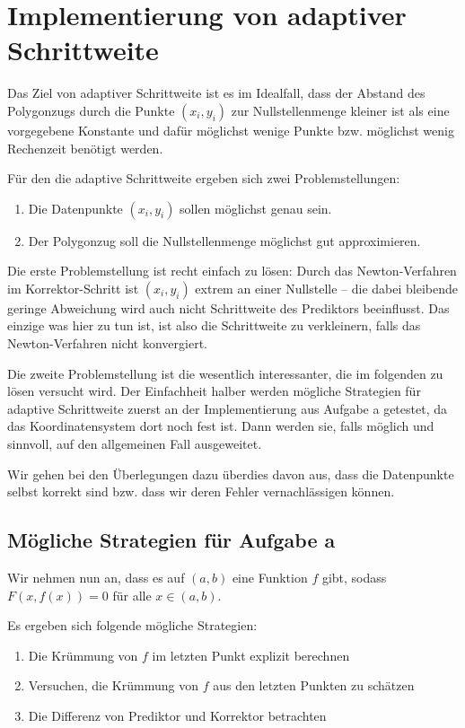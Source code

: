 \documentclass[a4paper,11pt,bibliography=totoc,listof=totoc,headinclude=true,cleardoublepage=empty,oneside]{scrartcl}
\begin{document}
\section{Implementierung von adaptiver Schrittweite}\label{chap:Schrittweite}
Das Ziel von adaptiver Schrittweite ist es im Idealfall, dass der Abstand des Polygonzugs durch die Punkte $(x_i,y_i)$ zur Nullstellenmenge kleiner ist als eine vorgegebene Konstante und dafür möglichst wenige Punkte bzw. möglichst wenig Rechenzeit benötigt werden.

Für den die adaptive Schrittweite ergeben sich zwei Problemstellungen:
\begin{enumerate}
	\item Die Datenpunkte $(x_i,y_i)$ sollen möglichst genau sein.
	\item Der Polygonzug soll die Nullstellenmenge möglichst gut approximieren.
\end{enumerate}

Die erste Problemstellung ist recht einfach zu lösen: Durch das Newton-Verfahren im Korrektor-Schritt ist $(x_i,y_i)$ extrem an einer Nullstelle -- die dabei bleibende geringe Abweichung wird auch nicht Schrittweite des Prediktors beeinflusst. Das einzige was hier zu tun ist, ist also die Schrittweite zu verkleinern, falls das Newton-Verfahren nicht konvergiert. 

Die zweite Problemstellung ist die wesentlich interessanter, die im folgenden zu lösen versucht wird. Der Einfachheit halber werden mögliche Strategien für adaptive Schrittweite zuerst an der Implementierung aus Aufgabe a getestet, da das Koordinatensystem dort noch fest ist. Dann werden sie, falls möglich und sinnvoll, auf den allgemeinen Fall ausgeweitet.

Wir gehen bei den Überlegungen dazu überdies davon aus, dass die Datenpunkte selbst korrekt sind bzw. dass wir deren Fehler vernachlässigen können.
\subsection{Mögliche Strategien für Aufgabe a}\label{chap:5.1}
Wir nehmen nun an, dass es auf $(a,b)$ eine Funktion $f$ gibt, sodass $F(x,f(x))=0$ für alle $x \in (a,b)$. 

Es ergeben sich folgende mögliche Strategien:
\begin{enumerate}
	\item Die Krümmung von $f$  im letzten Punkt explizit berechnen
	\item Versuchen, die Krümmung von $f$ aus den letzten Punkten zu schätzen 
	\item Die Differenz von Prediktor und Korrektor betrachten
\end{enumerate}
\end{document}
